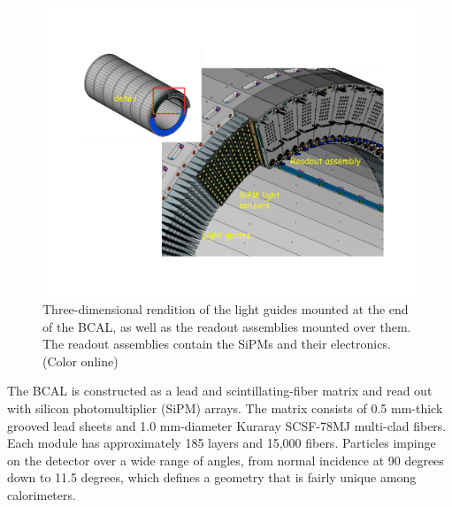 \begin{figure}[http]\centering
\includegraphics[scale=0.4]{figures/bcal_assemblies.pdf}
\caption{\label{fig:bcal:bcal_assemblies}
   Three-dimensional rendition of the light guides mounted at the end of the 
   BCAL, as well as the readout assemblies mounted over them. The 
   readout assemblies contain the 
   SiPMs and their electronics.  (Color online)
  }
\end{figure}
The BCAL is constructed as a lead and  scintillating-fiber matrix
and read out with silicon photomultiplier (SiPM) arrays. The matrix consists of 0.5 mm-thick grooved lead sheets and 1.0 mm-diameter Kuraray SCSF-78MJ multi-clad fibers.
Each module has approximately 185 layers and 15,000 fibers.
Particles impinge on the detector over a wide range of angles, from normal incidence at 90 degrees down to 11.5 degrees, which defines a geometry that is fairly unique among calorimeters. 

